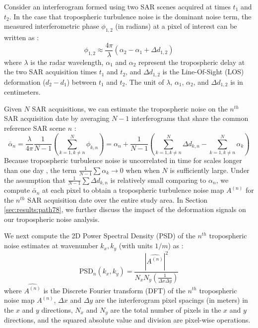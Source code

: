 Consider an interferogram formed using two SAR scenes acquired at times $t_1$ and $t_2$. In the case that tropospheric turbulence noise is the dominant noise term, the measured interferometric phase $\phi_{1,2}$ (in radians) at a pixel of interest can be written as \citep{Zebker1997AtmosphericEffectsInterferometric}:
\begin{equation}
	\phi_{1,2} \approx \frac{4 \pi}{\lambda} \left(\alpha_2 - \alpha_1 + \Delta d_{1,2} \right)
\end{equation}
where $ \lambda $ is the radar wavelength, $\alpha_1$ and $\alpha_2$ represent the tropospheric delay at the two SAR acquisition times $t_1$ and $t_2$, and $\Delta d_{1,2} $ is the Line-Of-Sight (LOS) deformation ($d_2-d_1$) between $t_1$ and $t_2$. The unit of $\lambda$, $\alpha_1$, $\alpha_2$, and $\Delta d_{1,2} $ is in centimeters. 

Given $N$ SAR acquisitions, we can estimate the tropospheric noise on the $n^{th}$ SAR acquisition date by averaging $N-1$ interferograms that share the common reference SAR scene $n$ \citep{Tymofyeyeva2015MitigationAtmosphericPhase}:
\begin{equation}
	\bar{\alpha}_n = \frac{\lambda}{4 \pi} \frac{1}{N-1} \left(\sum_{k=1, k \neq n}^{N} \phi_{k,n}\right)  =  \alpha_n  + \frac{1}{N-1} \left( \sum_{k=1, k \neq n}^{N}  \Delta d_{k,n} - \sum_{k=1, k \neq n}^{N}  \alpha_k  \right)  \label{eq:avg-ifg} 
\end{equation}
Because tropospheric turbulence noise is uncorrelated in time for scales longer than one day \citep{Emardson2003NeutralAtmosphericDelay, Onn2006ModelingWaterVapor}, the term $ \frac{1}{N-1} \sum \alpha_k \rightarrow 0$ when  when $N$ is sufficiently large. 
Under the assumption that $ \frac{1}{N-1} \sum \Delta d_{k,n} $ is relatively small comparing to $\alpha_n$, we compute $ \bar{\alpha}_n $ at each pixel to obtain a tropospheric turbulence noise map $A^{(n)}$ for the $n^{th}$ SAR acquisition date over the entire study area. In Section \ref{sec:results:path78}, we further discuss the impact of the deformation signals on our tropospheric noise analysis.


We next compute the 2D Power Spectral Density (PSD) of the $n^{th}$ tropospheric noise estimates at  wavenumber $ k_x, k_y $ (with units $1/m$) as \citep{Jacobs2017QuantitativeCharacterizationSurface}:
\begin{equation}
	\text{PSD}_n(k_x, k_y) = \frac{| \widehat{A^{(n)}} |^2 }{N_x N_y (\frac{1}{\Delta x \Delta y}) } \label{eq:pow-spec}
\end{equation}
where  $\widehat{A^{(n)}}$ is the Discrete Fourier transform (DFT) of  the $n^{th}$ tropospheric noise map $A^{(n)}$, $\Delta x$ and $\Delta y$ are the interferogram pixel spacings (in meters) in the $x$ and $y$ directions, $N_x$ and $N_y$ are the total number of pixels in the $x$ and $y$ directions, and the squared absolute value and division are pixel-wise operations. 


